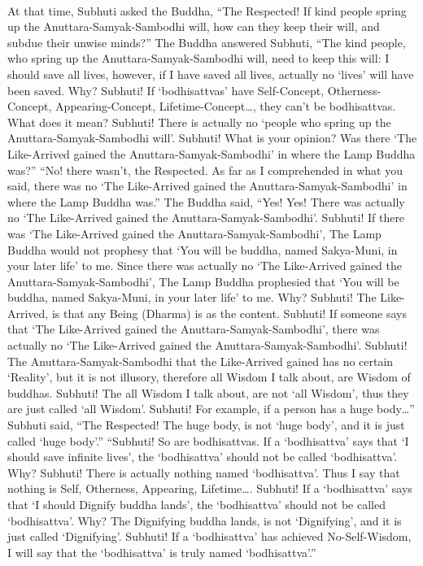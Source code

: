 \documentclass[a5paper,12pt]{book}
\begin{document}
    ~

     At that time, Subhuti asked the Buddha, ``The Respected! If kind people spring up the Anuttara-Samyak-Sambodhi will, how can they keep their will, and subdue their unwise minds?'' The Buddha answered Subhuti, ``The kind people, who spring up the Anuttara-Samyak-Sambodhi will, need to keep this will: I should save all lives, however, if I have saved all lives, actually no `lives' will have been saved. Why? Subhuti! If `bodhisattvas' have Self-Concept, Otherness-Concept, Appearing-Concept, Lifetime-Concept\dots{}, they can't be bodhisattvas. What does it mean? Subhuti! There is actually no `people who spring up the Anuttara-Samyak-Sambodhi will'. Subhuti! What is your opinion? Was there `The Like-Arrived gained the Anuttara-Samyak-Sambodhi' in where the Lamp Buddha was?'' ``No! there wasn't, the Respected. As far as I comprehended in what you said, there was no `The Like-Arrived gained the Anuttara-Samyak-Sambodhi' in where the Lamp Buddha was.'' The Buddha said, ``Yes! Yes! There was actually no `The Like-Arrived gained the Anuttara-Samyak-Sambodhi'. Subhuti! If there was `The Like-Arrived gained the Anuttara-Samyak-Sambodhi', The Lamp Buddha would not prophesy that `You will be buddha, named Sakya-Muni, in your later life' to me. Since there was actually no `The Like-Arrived gained the Anuttara-Samyak-Sambodhi', The Lamp Buddha prophesied that `You will be buddha, named Sakya-Muni, in your later life' to me. Why? Subhuti! The Like-Arrived, is that any Being (Dharma) is as the content. Subhuti! If someone says that `The Like-Arrived gained the Anuttara-Samyak-Sambodhi', there was actually no `The Like-Arrived gained the Anuttara-Samyak-Sambodhi'. Subhuti! The Anuttara-Samyak-Sambodhi that the Like-Arrived gained has no certain `Reality', but it is not illusory, therefore all Wisdom I talk about, are Wisdom of buddhas. Subhuti! The all Wisdom I talk about, are not `all Wisdom', thus they are just called `all Wisdom'. Subhuti! For example, if a person has a huge body\dots{}'' Subhuti said, ``The Respected! The huge body, is not `huge body', and it is just called `huge body'.'' ``Subhuti! So are bodhisattvas. If a `bodhisattva' says that `I should save infinite lives', the `bodhisattva' should not be called `bodhisattva'. Why? Subhuti! There is actually nothing named `bodhisattva'. Thus I say that nothing is Self, Otherness, Appearing, Lifetime\dots{}. Subhuti! If a `bodhisattva' says that `I should Dignify buddha lands', the `bodhisattva' should not be called `bodhisattva'. Why? The Dignifying buddha lands, is not `Dignifying', and it is just called `Dignifying'. Subhuti! If a `bodhisattva' has achieved No-Self-Wisdom, I will say that the `bodhisattva' is truly named `bodhisattva'.''
\end{document}
